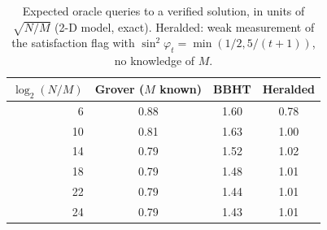 \begin{table}[h]\centering\small
\caption{Expected oracle queries to a verified solution, in units of $\sqrt{N/M}$ (2-D model, exact). Heralded: weak measurement of the satisfaction flag with $\sin^2\varphi_t=\min(1/2,5/(t+1))$, no knowledge of $M$.}\label{tab:herald}
\begin{tabular}{rccc}\toprule $\log_2(N/M)$ & Grover ($M$ known) & BBHT & Heralded\\\midrule
6 & 0.88 & 1.60 & 0.78\\
10 & 0.81 & 1.63 & 1.00\\
14 & 0.79 & 1.52 & 1.02\\
18 & 0.79 & 1.48 & 1.01\\
22 & 0.79 & 1.44 & 1.01\\
24 & 0.79 & 1.43 & 1.01\\
\bottomrule\end{tabular}
\end{table}